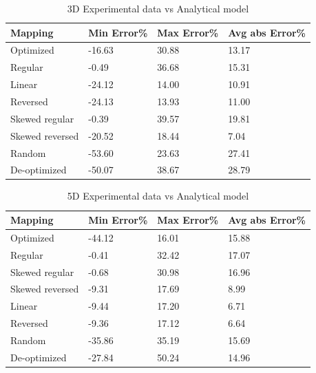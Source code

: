 \documentclass{acm_proc_article-sp}
\begin{document}
\begin{table}
  \caption{3D Experimental data vs Analytical model
    \label{table:data vs model 3d}}
  {\footnotesize
    \begin{tabular}{ | l | l | l | p{1.5cm} |}
    \hline
    Mapping    &    Min Error\% &    Max Error\% & Avg abs Error\%\\ \hline
    Optimized  &         -16.63 &          30.88 &         13.17\\ \hline
    Regular    &          -0.49 &          36.68 &         15.31\\ \hline
    Linear     &         -24.12 &          14.00 &         10.91\\ \hline
    Reversed   &         -24.13 &          13.93 &         11.00\\ \hline
    Skewed regular &      -0.39 &          39.57 &         19.81\\ \hline
    Skewed reversed&     -20.52 &          18.44 &          7.04\\ \hline
    Random  &            -53.60 &          23.63 &         27.41\\ \hline
    De-optimized &       -50.07 &          38.67 &         28.79\\ \hline
    \hline
    \end{tabular}
  }
\end{table}


\begin{table}
  \caption{5D Experimental data vs Analytical model
    \label{table:data vs model 5d}}
  {\footnotesize
    \begin{tabular}{ | l | l | l | p{1.5cm} |}
    \hline
    Mapping         &    Min Error\% &   Max Error\% & Avg abs Error\%\\ \hline
    Optimized       &         -44.12 & 16.01 & 15.88\\ \hline
    Regular         &         -0.41  & 32.42 & 17.07\\ \hline
    Skewed regular  &         -0.68  & 30.98 & 16.96\\ \hline
    Skewed reversed &         -9.31  & 17.69 & 8.99\\ \hline
    Linear          &         -9.44  & 17.20 & 6.71\\ \hline
    Reversed        &         -9.36  & 17.12 & 6.64\\ \hline
    Random          &         -35.86 & 35.19 & 15.69\\ \hline
    De-optimized    &         -27.84 & 50.24 & 14.96\\ \hline
    \hline
    \end{tabular}
  }
\end{table}
\end{document}
